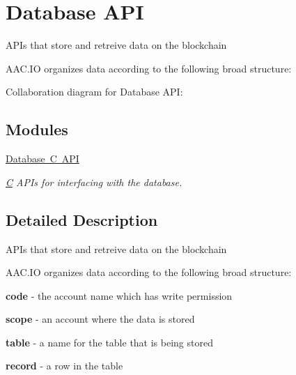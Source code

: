 \hypertarget{group__database}{}\section{Database A\+PI}
\label{group__database}


A\+P\+Is that store and retreive data on the blockchain

A\+A\+C.\+IO organizes data according to the following broad structure\+:  


Collaboration diagram for Database A\+PI\+:
\subsection*{Modules}
\begin{DoxyCompactItemize}
\item 
\mbox{\hyperlink{group__database_c}{Database C A\+PI}}
\begin{DoxyCompactList}\small\item\em \mbox{\hyperlink{struct_c}{C}} A\+P\+Is for interfacing with the database. \end{DoxyCompactList}\end{DoxyCompactItemize}


\subsection{Detailed Description}
A\+P\+Is that store and retreive data on the blockchain

A\+A\+C.\+IO organizes data according to the following broad structure\+: 


\begin{DoxyItemize}
\item {\bfseries code} -\/ the account name which has write permission
\begin{DoxyItemize}
\item {\bfseries scope} -\/ an account where the data is stored
\begin{DoxyItemize}
\item {\bfseries table} -\/ a name for the table that is being stored
\begin{DoxyItemize}
\item {\bfseries record} -\/ a row in the table
\end{DoxyItemize}
\end{DoxyItemize}
\end{DoxyItemize}
\end{DoxyItemize}

